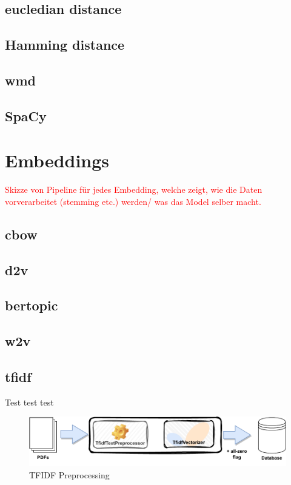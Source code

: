 \subsection{eucledian distance}\label{subsec:eucledian-distance}

\subsection{Hamming distance}\label{subsec:hamming-distance}

\subsection{\ac{wmd}}\label{subsec:word-mover-distance}

\subsection{SpaCy}\label{subsec:spacy}


\section{Embeddings}\label{sec:embeddings}

\textcolor{red}{Skizze von Pipeline für jedes Embedding, welche zeigt, wie die Daten vorverarbeitet (stemming etc.) werden/ was das Model selber macht.}

\subsection{\ac{cbow}}\label{subsec:bag-of-words}

\subsection{\ac{d2v}}\label{subsec:doc2vec}

\subsection{\ac{bertopic}}\label{subsec:bertopic}

\subsection{\ac{w2v}}\label{subsec:word2vec}

\subsection{\ac{tfidf}}\label{subsec:tfidf}
Test test test
\begin{figure}[h] %
    \centering
    \includegraphics[width=1.0\textwidth]{images/TFIDF_embedding}
    \caption{TFIDF Preprocessing}
    \label{fig:tfidf_embedding}
\end{figure}

